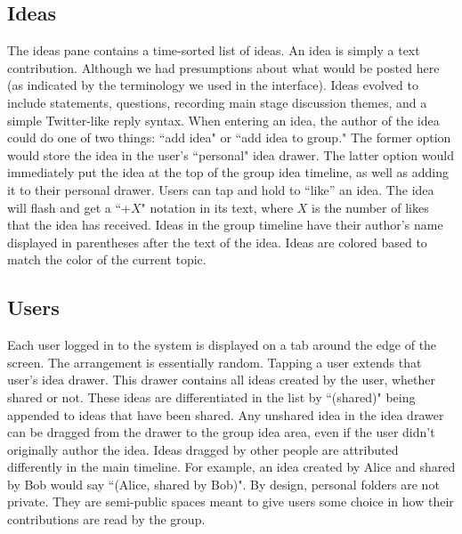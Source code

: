 \subsection{Ideas}
The ideas pane contains a time-sorted list of ideas. An idea is simply a text contribution. Although we had presumptions about what would be posted here (as indicated by the terminology we used in the interface). Ideas evolved to include statements, questions, recording main stage discussion themes, and a simple Twitter-like reply syntax. When entering an idea, the author of the idea could do one of two things: ``add idea" or ``add idea to group." The former option would store the idea in the user's ``personal" idea drawer.  The latter option would immediately put the idea at the top of the group idea timeline, as well as adding it to their personal drawer. Users can tap and hold to ``like'' an idea. The idea will flash and get a ``+$X$" notation in its text, where $X$ is the number of likes that the idea has received. Ideas in the group timeline have their author's name displayed in parentheses after the text of the idea. Ideas are colored based to match the color of the current topic. 

\subsection{Users}
Each user logged in to the system is displayed on a tab around the edge of the screen. The arrangement is essentially random. Tapping a user extends that user's idea drawer. This drawer contains all ideas created by the user, whether shared or not. These ideas are differentiated in the list by ``(shared)" being appended to ideas that have been shared. Any unshared idea in the idea drawer can be dragged from the drawer to the group idea area, even if the user didn't originally author the idea. Ideas dragged by other people are attributed differently in the main timeline. For example, an idea created by Alice and shared by Bob would say ``(Alice, shared by Bob)". By design, personal folders are not private.  They are semi-public spaces meant to give users some choice in how their contributions are read by the group.

